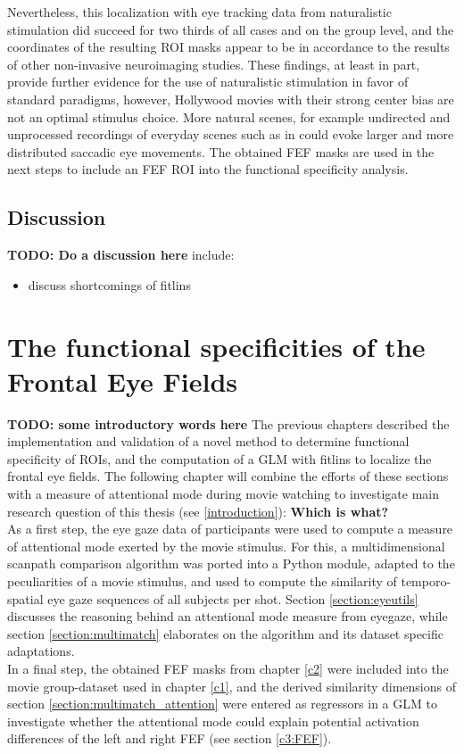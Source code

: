 \documentclass[a4paper, 12pt]{scrreprt}
\begin{document}
Nevertheless, this localization with eye tracking data from naturalistic stimulation did succeed for two thirds of all cases and on the group level, and the coordinates of the resulting ROI masks appear to be in accordance to the results of other non-invasive neuroimaging studies. These findings, at least in part, provide further evidence for the use of naturalistic stimulation in favor of standard paradigms, however, Hollywood movies with their strong center bias are not an optimal stimulus choice. More natural scenes, for example undirected and unprocessed recordings of everyday scenes such as in \textcite{tseng2009quantifying} could evoke larger and more distributed saccadic eye movements. The obtained FEF masks are used in the next steps to include an FEF ROI into the functional specificity analysis.



\section{Discussion}
\textbf{TODO: Do a discussion here}
include:
\begin{itemize}

	\item{discuss shortcomings of fitlins}
	
\end{itemize}

\chapter{The functional specificities of the Frontal Eye Fields}\label{c3}

\textbf{TODO: some introductory words here}
The previous chapters described the implementation and validation of a novel method to determine functional specificity of ROIs, and the computation of a GLM with fitlins to localize the frontal eye fields. The following chapter will combine the efforts of these sections with a measure of attentional mode during movie watching to investigate main research question of this thesis (see \ref{introduction}): \textbf{Which is what?} \\
As a first step, the eye gaze data of participants were used to compute a measure of attentional mode exerted by the movie stimulus. For this, a multidimensional scanpath comparison algorithm was ported into a Python module, adapted to the peculiarities of a movie stimulus, and used to compute the similarity of temporo-spatial eye gaze sequences of all subjects per shot. Section \ref{section:eyeutils} discusses the reasoning behind an attentional mode measure from eyegaze, while section \ref{section:multimatch} elaborates on the algorithm and its dataset specific adaptations. \\
In a final step, the obtained FEF masks from chapter \ref{c2} were included into the movie group-dataset used in chapter \ref{c1}, and the derived similarity dimensions of section \ref{section:multimatch_attention} were entered as regressors in a GLM to investigate whether the attentional mode could explain potential activation differences of the left and right FEF (see section \ref{c3:FEF}). 
\end{document}
